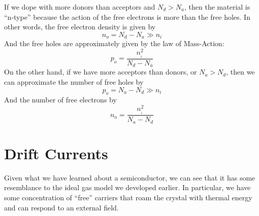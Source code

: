 If we dope with more donors than acceptors and $N_d > N_a$, then the material is “n-type” because the action of the free electrons is more than the free holes.  In other words, the free electron density is given by
\begin{equation}
        {n_o} = {N_d} - {N_a} \gg {n_i}
\end{equation}
And the free holes are approximately given by the law of Mass-Action:
\begin{equation}
        {p_o} = \frac{{n_{_i}^2}}{{{N_d} - {N_a}}}
\end{equation}
On the other hand, if we have more acceptors than donors, or  $N_a > N_d$, then we can approximate the number of free holes by
\begin{equation}
        {p_o} = {N_a} - {N_d} \gg {n_i}
\end{equation}
And the number of free electrons by
\begin{equation}
        {n_o} = \frac{{n_{_i}^2}}{{{N_a} - {N_d}}}
\end{equation}
\section{Drift Currents}
Given what we have learned about a semiconductor, we can see that it has some resemblance to the ideal gas model we developed earlier.  In particular, we have some concentration of “free” carriers that roam the crystal with thermal energy and can respond to an external field.  

